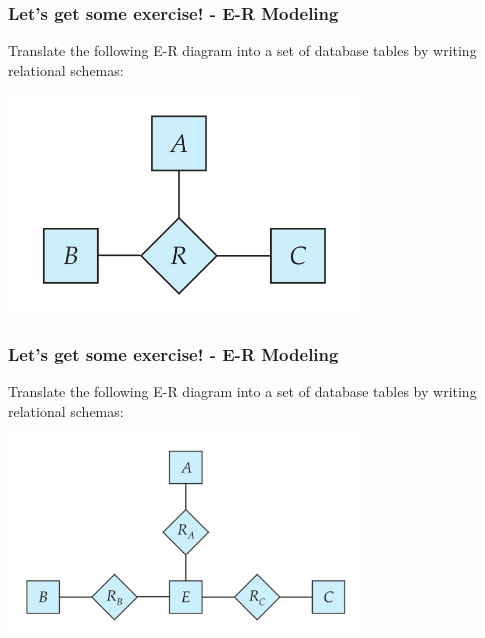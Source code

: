 \begin{frame}
\frametitle{Let's get some exercise! - E-R Modeling}

Translate the following E-R diagram into a set of database tables by writing relational schemas:

\begin{center}
  \includegraphics[width=0.7\textwidth]{images/ternary-relationship.png}
\end{center}

\end{frame}


\begin{frame}
\frametitle{Let's get some exercise! - E-R Modeling}

Translate the following E-R diagram into a set of database tables by writing relational schemas:

\begin{center}
  \includegraphics[width=0.7\textwidth]{images/three-binary-relationships.png}
\end{center}

\end{frame}


